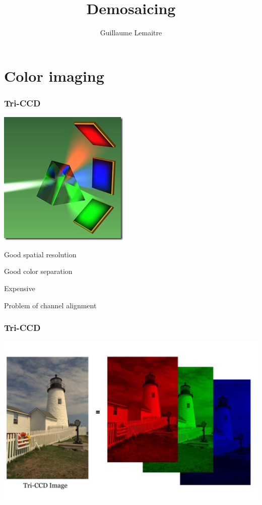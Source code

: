 \documentclass{beamer}
\title{Demosaicing}
\author{Guillaume Lemaitre}
\institute{Universit\'e de Bourgogne}
\begin{document}
\begin{frame}
  \titlepage
\end{frame}

\begin{frame}
  \tableofcontents[sectionstyle=show,subsectionstyle=show,subsubsectionstyle=hide]
\end{frame}

\section{Color imaging}
\begin{frame}
\frametitle{Tri-CCD}
\begin{center}
\includegraphics[scale= 0.8]{images/L7_triCCD.jpg}
\end{center}
\footnotesize{
\begin{itemize}
\item {\color{blue}
Good spatial resolution
\item Good color separation}
\item {\color{red}Expensive
\item Problem of channel alignment}

\end{itemize}
}
\end{frame}
\begin{frame}
\frametitle{Tri-CCD}
\begin{center}
\includegraphics[scale=0.35]{images/L7_ex_triCCD.png}
\end{center}
\end{frame}
\end{document}
